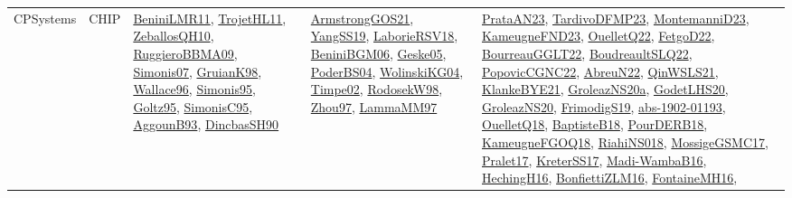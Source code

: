 {\begin{longtable}{lp{3cm}>{\raggedright}p{6cm}>{\raggedright}p{6cm}p{8cm}}
CPSystems & CHIP & \href{articles/BeniniLMR11.pdf}{BeniniLMR11}\cite{BeniniLMR11}, \href{articles/TrojetHL11.pdf}{TrojetHL11}\cite{TrojetHL11}, \href{articles/ZeballosQH10.pdf}{ZeballosQH10}\cite{ZeballosQH10}, \href{articles/RuggieroBBMA09.pdf}{RuggieroBBMA09}\cite{RuggieroBBMA09}, \href{articles/Simonis07.pdf}{Simonis07}\cite{Simonis07}, \href{papers/GruianK98.pdf}{GruianK98}\cite{GruianK98}, \href{articles/Wallace96.pdf}{Wallace96}\cite{Wallace96}, \href{papers/Simonis95.pdf}{Simonis95}\cite{Simonis95}, \href{papers/Goltz95.pdf}{Goltz95}\cite{Goltz95}, \href{papers/SimonisC95.pdf}{SimonisC95}\cite{SimonisC95}, \href{articles/AggounB93.pdf}{AggounB93}\cite{AggounB93}, \href{articles/DincbasSH90.pdf}{DincbasSH90}\cite{DincbasSH90} & \href{papers/ArmstrongGOS21.pdf}{ArmstrongGOS21}\cite{ArmstrongGOS21}, \href{papers/YangSS19.pdf}{YangSS19}\cite{YangSS19}, \href{articles/LaborieRSV18.pdf}{LaborieRSV18}\cite{LaborieRSV18}, \href{papers/BeniniBGM06.pdf}{BeniniBGM06}\cite{BeniniBGM06}, \href{papers/Geske05.pdf}{Geske05}\cite{Geske05}, \href{articles/PoderBS04.pdf}{PoderBS04}\cite{PoderBS04}, \href{papers/WolinskiKG04.pdf}{WolinskiKG04}\cite{WolinskiKG04}, \href{articles/Timpe02.pdf}{Timpe02}\cite{Timpe02}, \href{papers/RodosekW98.pdf}{RodosekW98}\cite{RodosekW98}, \href{articles/Zhou97.pdf}{Zhou97}\cite{Zhou97}, \href{articles/LammaMM97.pdf}{LammaMM97}\cite{LammaMM97} & \href{articles/PrataAN23.pdf}{PrataAN23}\cite{PrataAN23}, \href{papers/TardivoDFMP23.pdf}{TardivoDFMP23}\cite{TardivoDFMP23}, \href{articles/MontemanniD23.pdf}{MontemanniD23}\cite{MontemanniD23}, \href{papers/KameugneFND23.pdf}{KameugneFND23}\cite{KameugneFND23}, \href{papers/OuelletQ22.pdf}{OuelletQ22}\cite{OuelletQ22}, \href{articles/FetgoD22.pdf}{FetgoD22}\cite{FetgoD22}, \href{articles/BourreauGGLT22.pdf}{BourreauGGLT22}\cite{BourreauGGLT22}, \href{papers/BoudreaultSLQ22.pdf}{BoudreaultSLQ22}\cite{BoudreaultSLQ22}, \href{papers/PopovicCGNC22.pdf}{PopovicCGNC22}\cite{PopovicCGNC22}, \href{articles/AbreuN22.pdf}{AbreuN22}\cite{AbreuN22}, \href{articles/QinWSLS21.pdf}{QinWSLS21}\cite{QinWSLS21}, \href{papers/KlankeBYE21.pdf}{KlankeBYE21}\cite{KlankeBYE21}, \href{papers/GroleazNS20a.pdf}{GroleazNS20a}\cite{GroleazNS20a}, \href{papers/GodetLHS20.pdf}{GodetLHS20}\cite{GodetLHS20}, \href{papers/GroleazNS20.pdf}{GroleazNS20}\cite{GroleazNS20}, \href{papers/FrimodigS19.pdf}{FrimodigS19}\cite{FrimodigS19}, \href{articles/abs-1902-01193.pdf}{abs-1902-01193}\cite{abs-1902-01193}, \href{papers/OuelletQ18.pdf}{OuelletQ18}\cite{OuelletQ18}, \href{articles/BaptisteB18.pdf}{BaptisteB18}\cite{BaptisteB18}, \href{articles/PourDERB18.pdf}{PourDERB18}\cite{PourDERB18}, \href{papers/KameugneFGOQ18.pdf}{KameugneFGOQ18}\cite{KameugneFGOQ18}, \href{papers/RiahiNS018.pdf}{RiahiNS018}\cite{RiahiNS018}, \href{papers/MossigeGSMC17.pdf}{MossigeGSMC17}\cite{MossigeGSMC17}, \href{papers/Pralet17.pdf}{Pralet17}\cite{Pralet17}, \href{articles/KreterSS17.pdf}{KreterSS17}\cite{KreterSS17}, \href{papers/Madi-WambaB16.pdf}{Madi-WambaB16}\cite{Madi-WambaB16}, \href{papers/HechingH16.pdf}{HechingH16}\cite{HechingH16}, \href{papers/BonfiettiZLM16.pdf}{BonfiettiZLM16}\cite{BonfiettiZLM16}, \href{papers/FontaineMH16.pdf}{FontaineMH16}\cite{FontaineMH16}, 
\end{longtable}}
